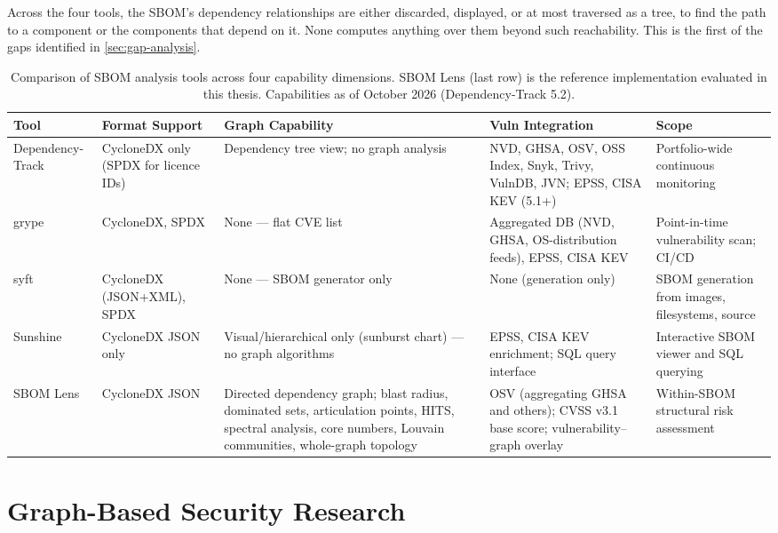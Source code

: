 Across the four tools, the SBOM's dependency relationships are either discarded, displayed, or at most traversed as a tree, to find the path to a component or the components that depend on it. None computes anything over them beyond such reachability. This is the first of the gaps identified in \autoref{sec:gap-analysis}.

\begin{table}[!htpb]
    \centering
    \small
    \renewcommand{\tabularxcolumn}[1]{p{#1}}
    \caption[Comparison of SBOM analysis tools]{Comparison of SBOM analysis tools across four capability dimensions. SBOM Lens (last row) is the reference implementation evaluated in this thesis. Capabilities as of October 2026 (Dependency-Track 5.2).}
    \label{tab:sbom-tools}
    \begin{tabularx}{\textwidth}{@{}p{1.8cm}p{2.1cm}LLL@{}}
        \toprule
        \textbf{Tool} & \textbf{Format Support} & \textbf{Graph Capability} & \textbf{Vuln Integration} & \textbf{Scope} \\
        \midrule
        Dependency-Track & CycloneDX only (SPDX for licence IDs) & Dependency tree view; no graph analysis & NVD, GHSA, OSV, OSS Index, Snyk, Trivy, VulnDB, JVN; EPSS, CISA KEV (5.1+) & Portfolio-wide continuous monitoring \\
        grype & CycloneDX, SPDX & None --- flat CVE list & Aggregated DB (NVD, GHSA, OS-distribution feeds), EPSS, CISA KEV & Point-in-time vulnerability scan; CI/CD \\
        syft & CycloneDX (JSON+XML), SPDX & None --- SBOM generator only & None (generation only) & SBOM generation from images, filesystems, source \\
        Sunshine & CycloneDX JSON only & Visual/hierarchical only (sunburst chart) --- no graph algorithms & EPSS, CISA KEV enrichment; SQL query interface & Interactive SBOM viewer and SQL querying \\
        \midrule
        SBOM Lens & CycloneDX JSON & Directed dependency graph; blast radius, dominated sets, articulation points, HITS, spectral analysis, core numbers, Louvain communities, whole-graph topology & OSV (aggregating GHSA and others); CVSS v3.1 base score; vulnerability--graph overlay & Within-SBOM structural risk assessment \\
        \bottomrule
    \end{tabularx}
\end{table}


\section{Graph-Based Security Research}
\label{sec:graph-security-research}

